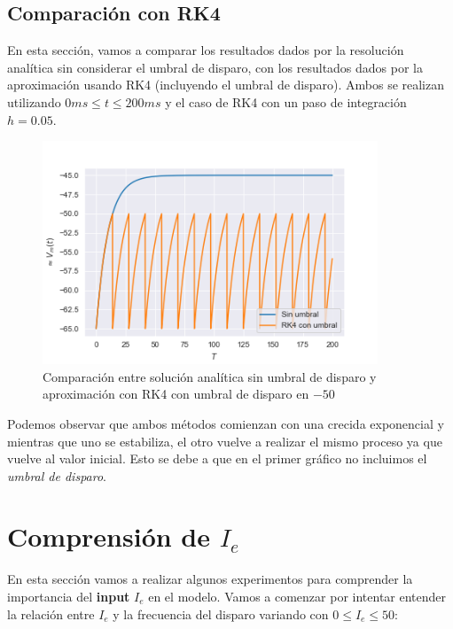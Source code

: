 \documentclass [a4paper,12pt,oneside,final]{article}
\begin{document}
\pagebreak
\subsection{Comparación con RK4}

En esta sección, vamos a comparar los resultados dados por la resolución analítica sin considerar el umbral de disparo, con los resultados dados por la aproximación usando RK4 (incluyendo el umbral de disparo). Ambos se realizan utilizando $ 0ms \leq t \leq 200ms $ y el caso de RK4 con un paso de integración $ h = 0.05 $.

\begin{figure}[ht]
  \centering
  \includegraphics[width=10cm,keepaspectratio]{./diagramas/grafico_b.png}
  \caption{Comparación entre solución analítica sin umbral de disparo y aproximación con RK4 con umbral de disparo en $-50$}
\end{figure}

Podemos observar que ambos métodos comienzan con una crecida exponencial y mientras que uno se estabiliza, el otro vuelve a realizar el mismo proceso ya que vuelve al valor inicial. Esto se debe a que en el primer gráfico no incluimos el {\it umbral de disparo}. 

\section{Comprensión de $I_e$}

En esta sección vamos a realizar algunos experimentos para comprender la importancia del {\bf input} $I_e$ en el modelo. Vamos a comenzar por intentar entender la relación entre $I_e$ y la frecuencia del disparo variando con $ 0 \leq I_e \leq 50  $:
\end{document}
